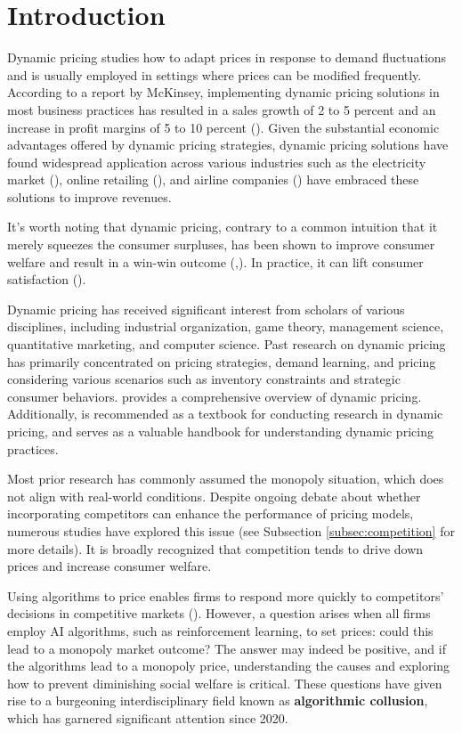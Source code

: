 \documentclass[mnsc,nonblindrev]{workingpaper}
\begin{document}
\section{Introduction}
\label{sec:intro}
Dynamic pricing studies how to adapt prices in response to demand fluctuations and is usually employed in settings where prices can be modified frequently. According to a report by McKinsey, implementing dynamic pricing solutions in most business practices has resulted in a sales growth of 2 to 5 percent and an increase in profit margins of 5 to 10 percent (\cite{benmark2017retailers}). Given the substantial economic advantages offered by dynamic pricing strategies, dynamic pricing solutions have found widespread application across various industries such as the electricity market (\cite{dutta2017literature}), online retailing (\cite{lei2018joint}), and airline companies (\cite{wittman2019dynamic}) have embraced these solutions to improve revenues.

It's worth noting that dynamic pricing, contrary to a common intuition that it merely squeezes the consumer surpluses, has been shown to improve consumer welfare and result in a win-win outcome (\cite{chen2019welfare},\cite{williams2022welfare}). In practice, it can lift consumer satisfaction (\cite{benmark2017retailers}).

Dynamic pricing has received significant interest from scholars of various disciplines, including industrial organization, game theory, management science, quantitative marketing, and computer science. Past research on dynamic pricing has primarily concentrated on pricing strategies, demand learning, and pricing considering various scenarios such as inventory constraints and strategic consumer behaviors. \cite{den2015dynamic} provides a comprehensive overview of dynamic pricing. Additionally, \cite{gallegoRevenueManagementPricing2019} is recommended as a textbook for conducting research in dynamic pricing, and \cite{ozer2012oxford} serves as a valuable handbook for understanding dynamic pricing practices. 

Most prior research has commonly assumed the monopoly situation, which does not align with real-world conditions. Despite ongoing debate about whether incorporating competitors can enhance the performance of pricing models, numerous studies have explored this issue (see Subsection \ref{subsec:competition} for more details). It is broadly recognized that competition tends to drive down prices and increase consumer welfare.

Using algorithms to price enables firms to respond more quickly to competitors' decisions in competitive markets (\cite{brown2023competition}). However, a question arises when all firms employ AI algorithms, such as reinforcement learning, to set prices: could this lead to a monopoly market outcome? The answer may indeed be positive, and if the algorithms lead to a monopoly price, understanding the causes and exploring how to prevent diminishing social welfare is critical. These questions have given rise to a burgeoning interdisciplinary field known as \textbf{algorithmic collusion}, which has garnered significant attention since 2020.
\end{document}

